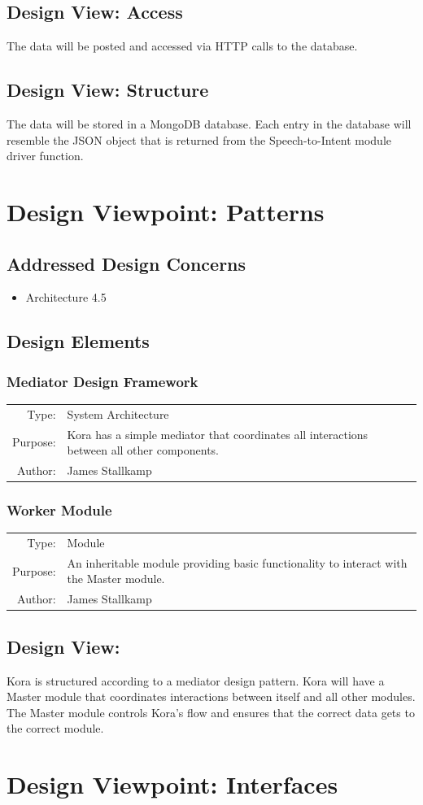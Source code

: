 \documentclass[onecolumn, draftclsnofoot,10pt, compsoc]{IEEEtran}
\def \botname{Kora\xspace}
\newcommand{\designConcernRef}[2][]{
    #2 #1
}
\newcommand{\designElementDef}[4]{
    \subsubsection{#1}
    \begin{tabular}[t]{r p{6in}}
        Type: & #2 \\
        Purpose: & #3 \\
        Author: & #4 \\
    \end{tabular}
}
\begin{document}
	\subsection{Design View: Access}
		The data will be posted and accessed via HTTP calls to the database.
	
	\subsection{Design View: Structure}
		The data will be stored in a MongoDB database.
		Each entry in the database will resemble the JSON object that is returned from the Speech-to-Intent module driver function.
		
		

\section{Design Viewpoint: Patterns}
    \subsection{Addressed Design Concerns}
        \begin{itemize}
            \item \designConcernRef[4.5]{Architecture}
        \end{itemize}

    \subsection{Design Elements}
		\designElementDef{Mediator Design Framework}
						 {System Architecture}
						 {\botname has a simple mediator that coordinates all interactions between all other components.}
						 {James Stallkamp}
		\designElementDef{Worker Module}
						 {Module}
						 {An inheritable module providing basic functionality to interact with the Master module.}
						 {James Stallkamp}				 
    \subsection{Design View: }
		\botname is structured according to a mediator design pattern. 
		\botname will have a Master module that coordinates interactions between itself and all other modules.
		The Master module controls Kora's flow and ensures that the correct data gets to the correct module.


\section{Design Viewpoint: Interfaces}
\end{document}
